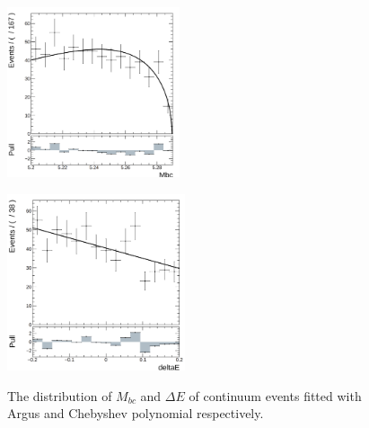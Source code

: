 \begin{figure}[H]
	\begin{minipage}[b]{0.5\linewidth}
		\centering 
		\includegraphics[height=5cm]{figures/mbc-cs-hist}
		\label{}
	\end{minipage}
	\begin{minipage}[b]{0.5\linewidth}
		\centering 
		\includegraphics[height=5.2cm]{figures/dE-cs-hist}
		\label{}
	\end{minipage}
	\caption{The distribution of $M_{bc}$ and $\Delta E$ of continuum events fitted with Argus and Chebyshev polynomial respectively.}
\end{figure}

